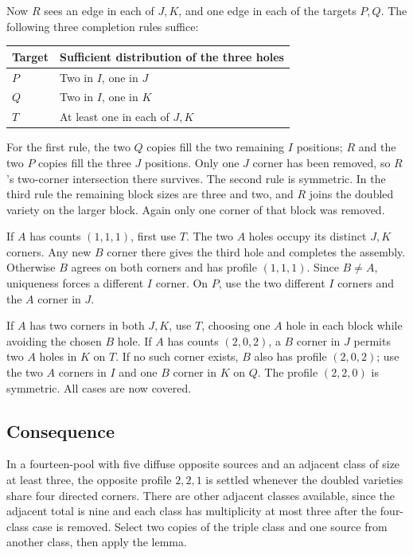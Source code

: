 \documentclass[
  10pt,
]{article}
\begin{document}
Now \(R\) sees an edge in each of \(J,K\), and one edge in each of the
targets \(P,Q\). The following three completion rules suffice:

\begin{longtable}[]{@{}ll@{}}
\toprule\noalign{}
Target & Sufficient distribution of the three holes \\
\midrule\noalign{}
\endhead
\bottomrule\noalign{}
\endlastfoot
\(P\) & Two in \(I\), one in \(J\) \\
\(Q\) & Two in \(I\), one in \(K\) \\
\(T\) & At least one in each of \(J,K\) \\
\end{longtable}

For the first rule, the two \(Q\) copies fill the two remaining \(I\)
positions; \(R\) and the two \(P\) copies fill the three \(J\)
positions. Only one \(J\) corner has been removed, so \(R\)'s two-corner
intersection there survives. The second rule is symmetric. In the third
rule the remaining block sizes are three and two, and \(R\) joins the
doubled variety on the larger block. Again only one corner of that block
was removed.

If \(A\) has counts \((1,1,1)\), first use \(T\). The two \(A\) holes
occupy its distinct \(J,K\) corners. Any new \(B\) corner there gives
the third hole and completes the assembly. Otherwise \(B\) agrees on
both corners and has profile \((1,1,1)\). Since \(B\ne A\), uniqueness
forces a different \(I\) corner. On \(P\), use the two different \(I\)
corners and the \(A\) corner in \(J\).

If \(A\) has two corners in both \(J,K\), use \(T\), choosing one \(A\)
hole in each block while avoiding the chosen \(B\) hole. If \(A\) has
counts \((2,0,2)\), a \(B\) corner in \(J\) permits two \(A\) holes in
\(K\) on \(T\). If no such corner exists, \(B\) also has profile
\((2,0,2)\); use the two \(A\) corners in \(I\) and one \(B\) corner in
\(K\) on \(Q\). The profile \((2,2,0)\) is symmetric. All cases are now
covered.

\hypertarget{consequence}{%
\subsection*{Consequence}\label{consequence}}

In a fourteen-pool with five diffuse opposite sources and an adjacent
class of size at least three, the opposite profile \(2,2,1\) is settled
whenever the doubled varieties share four directed corners. There are
other adjacent classes available, since the adjacent total is nine and
each class has multiplicity at most three after the four-class case is
removed. Select two copies of the triple class and one source from
another class, then apply the lemma.
\end{document}
